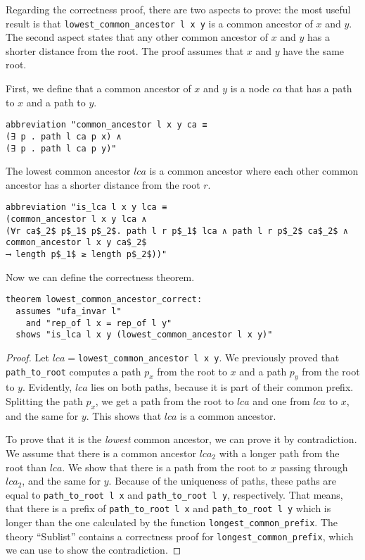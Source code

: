 Regarding the correctness proof, there are two aspects to prove: the most useful result is that \lstinline{lowest_common_ancestor l x y} is a common ancestor of $x$ and $y$. The second aspect states that any other common ancestor of $x$ and $y$ has a shorter distance from the root. The proof assumes that $x$ and $y$ have the same root.

First, we define that a common ancestor of $x$ and $y$ is a node $ca$ that has a path to $x$ and a path to $y$.

\begin{lstlisting}
abbreviation "common_ancestor l x y ca ≡
(∃ p . path l ca p x) ∧
(∃ p . path l ca p y)"
\end{lstlisting}

The lowest common ancestor $lca$ is a common ancestor where each other common ancestor has a shorter distance from the root $r$.

\begin{lstlisting}
abbreviation "is_lca l x y lca ≡
(common_ancestor l x y lca ∧
(∀r ca$_2$ p$_1$ p$_2$. path l r p$_1$ lca ∧ path l r p$_2$ ca$_2$ ∧ common_ancestor l x y ca$_2$
⟶ length p$_1$ ≥ length p$_2$))"
\end{lstlisting}

Now we can define the correctness theorem.

\begin{lstlisting}
theorem lowest_common_ancestor_correct:
  assumes "ufa_invar l"
    and "rep_of l x = rep_of l y"
  shows "is_lca l x y (lowest_common_ancestor l x y)"
\end{lstlisting}

\begin{proof}
Let $lca =$\lstinline{lowest_common_ancestor l x y}. We previously proved that \lstinline{path_to_root} computes a path $p_x$ from the root to $x$ and a path $p_y$ from the root to $y$. Evidently, $lca$ lies on both paths, because it is part of their common prefix. Splitting the path $p_x$, we get a path from the root to $lca$ and one from $lca$ to $x$, and the same for $y$. This shows that $lca$ is a common ancestor.

To prove that it is the \emph{lowest} common ancestor, we can prove it by contradiction. We assume that there is a common ancestor $lca_2$ with a longer path from the root than $lca$. We show that there is a path from the root to $x$ passing through $lca_2$, and the same for $y$. Because of the uniqueness of paths, these paths are equal to \lstinline{path_to_root l x} and \lstinline{path_to_root l y}, respectively. That means, that there is a prefix of \lstinline{path_to_root l x} and \lstinline{path_to_root l y} which is longer than the one calculated by the function \lstinline{longest_common_prefix}. The theory ``Sublist'' contains a correctness proof for \lstinline{longest_common_prefix}, which we can use to show the contradiction.
\end{proof}

